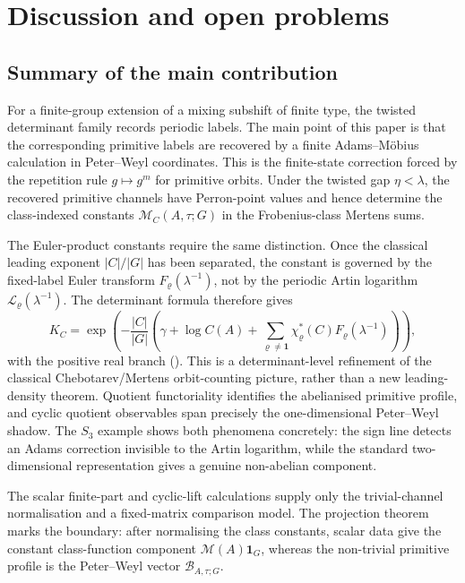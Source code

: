 \documentclass[11pt,a4paper]{amsart}
\theoremstyle{plain}
\theoremstyle{definition}
\theoremstyle{remark}
\begin{document}
\section{Discussion and open problems}\label{sec:conclusion}

\subsection{Summary of the main contribution}

For a finite-group extension of a mixing subshift of finite type, the
twisted determinant family records periodic labels. The main point of
this paper is that the corresponding primitive labels are recovered by a
finite Adams--M\"obius calculation in Peter--Weyl coordinates. This is
the finite-state correction forced by the repetition rule
\(g\mapsto g^m\) for primitive orbits. Under the twisted gap
\(\eta<\lambda\), the recovered primitive channels have Perron-point
values and hence determine the class-indexed constants
\(\mathcal M_C(A,\tau;G)\) in the Frobenius-class Mertens sums.

The Euler-product constants require the same distinction. Once the
classical leading exponent \(|C|/|G|\) has been separated, the constant is
governed by the fixed-label Euler transform
\(F_\varrho(\lambda^{-1})\), not by the periodic Artin logarithm
\(\mathcal L_\varrho(\lambda^{-1})\). The determinant formula therefore
gives
\[
  K_C=
  \exp\!\left(
    -\frac{|C|}{|G|}
    \left(
      \gamma+\log C(A)
      +\sum_{\varrho\neq\mathbf1}
        \chi_\varrho^\ast(C)F_\varrho(\lambda^{-1})
    \right)
  \right),
\]
with the positive real branch
(). This is a determinant-level refinement of
the classical Chebotarev/Mertens orbit-counting picture, rather than a
new leading-density theorem. Quotient functoriality identifies the
abelianised primitive profile, and cyclic quotient observables span
precisely the one-dimensional Peter--Weyl shadow. The \(S_3\) example
shows both phenomena concretely: the sign line detects an Adams
correction invisible to the Artin logarithm, while the standard
two-dimensional representation gives a genuine non-abelian component.

The scalar finite-part and cyclic-lift calculations supply only the
trivial-channel normalisation and a fixed-matrix comparison model. The
projection theorem
 marks the boundary:
after normalising the class constants, scalar data give the constant
class-function component \(\mathcal M(A)\mathbf 1_G\), whereas the
non-trivial primitive profile is the Peter--Weyl vector
\(\mathcal B_{A,\tau;G}\).
\end{document}
